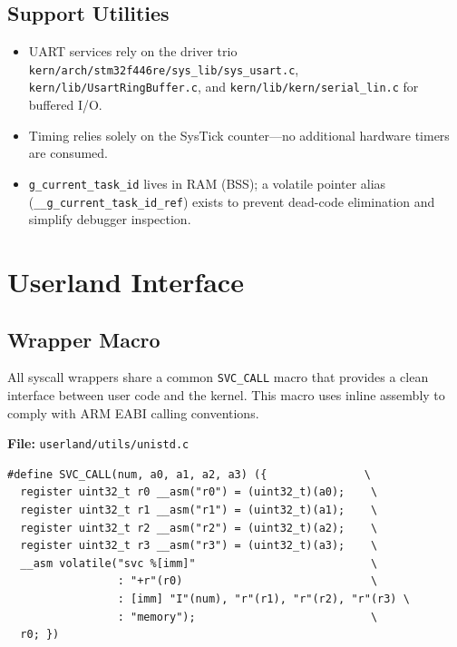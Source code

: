 \documentclass[11pt,a4paper]{article}
\newcommand{\file}[1]{\texttt{#1}}
\begin{document}
\subsection{Support Utilities}
\begin{itemize}[leftmargin=1.5em]
  \item UART services rely on the driver trio \file{kern/arch/stm32f446re/sys\_lib/sys\_usart.c}, \file{kern/lib/UsartRingBuffer.c}, and \file{kern/lib/kern/serial\_lin.c} for buffered I/O.
  \item Timing relies solely on the SysTick counter---no additional hardware timers are consumed.
  \item \texttt{g\_current\_task\_id} lives in RAM (BSS); a volatile pointer alias (\texttt{\_\_g\_current\_task\_id\_ref}) exists to prevent dead-code elimination and simplify debugger inspection.
\end{itemize}

\section{Userland Interface}

\subsection{Wrapper Macro}
All syscall wrappers share a common \texttt{SVC\_CALL} macro that provides a clean interface between user code and the kernel. This macro uses inline assembly to comply with ARM EABI calling conventions.

\vspace{0.3cm}
\noindent\textbf{File:} \file{userland/utils/unistd.c}
\begin{verbatim}
#define SVC_CALL(num, a0, a1, a2, a3) ({               \
  register uint32_t r0 __asm("r0") = (uint32_t)(a0);    \
  register uint32_t r1 __asm("r1") = (uint32_t)(a1);    \
  register uint32_t r2 __asm("r2") = (uint32_t)(a2);    \
  register uint32_t r3 __asm("r3") = (uint32_t)(a3);    \
  __asm volatile("svc %[imm]"                           \
                 : "+r"(r0)                             \
                 : [imm] "I"(num), "r"(r1), "r"(r2), "r"(r3) \
                 : "memory");                           \
  r0; })
\end{verbatim}
\end{document}

